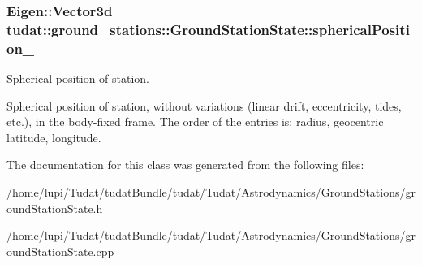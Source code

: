 \subsubsection[{\texorpdfstring{spherical\+Position\+\_\+}{sphericalPosition_}}]{\setlength{\rightskip}{0pt plus 5cm}Eigen\+::\+Vector3d tudat\+::ground\+\_\+stations\+::\+Ground\+Station\+State\+::spherical\+Position\+\_\+\hspace{0.3cm}{\ttfamily [protected]}}\hypertarget{classtudat_1_1ground__stations_1_1GroundStationState_aed814dd2ad671f8df67be153d92c1966}{}\label{classtudat_1_1ground__stations_1_1GroundStationState_aed814dd2ad671f8df67be153d92c1966}


Spherical position of station. 

Spherical position of station, without variations (linear drift, eccentricity, tides, etc.), in the body-\/fixed frame. The order of the entries is\+: radius, geocentric latitude, longitude. 

The documentation for this class was generated from the following files\+:\begin{DoxyCompactItemize}
\item 
/home/lupi/\+Tudat/tudat\+Bundle/tudat/\+Tudat/\+Astrodynamics/\+Ground\+Stations/ground\+Station\+State.\+h\item 
/home/lupi/\+Tudat/tudat\+Bundle/tudat/\+Tudat/\+Astrodynamics/\+Ground\+Stations/ground\+Station\+State.\+cpp\end{DoxyCompactItemize}
